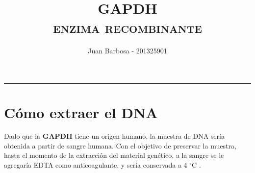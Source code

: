 \documentclass[12pt]{article}
\title{\color{blue} \scshape{GAPDH\\ enzima recombinante}}
\author{Juan Barbosa - 201325901}
\newcommand{\enzima}{\textbf{GAPDH}}
\begin{document}
	\maketitle
	\begin{multicols}{2}
		\footnotesize
		\tableofcontents
	\end{multicols}
	\rule{15cm}{0.4pt}

	\section{C\'omo extraer el DNA}
		Dado que la \enzima{} tiene un origen humano, la muestra de DNA ser\'ia obtenida a partir de sangre humana. Con el objetivo de preservar la muestra, hasta el momento de la extracci\'on del material gen\'etico, a la sangre se le agregar\'ia EDTA como anticoagulante, y ser\'ia conservada a 4 $^\circ$C \cite{m2011human, puregeneBook}.
\end{document}
